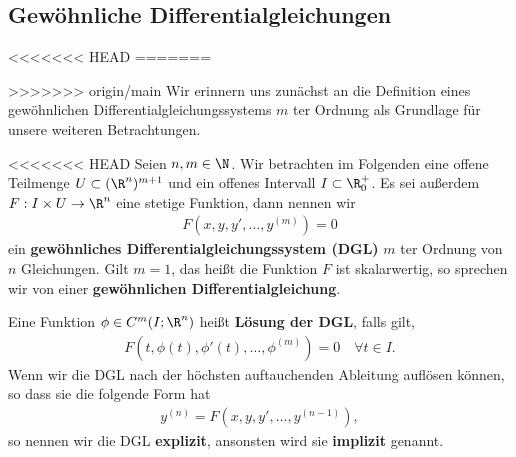 \documentclass[letterpaper,10pt,english]{jupyterBook}
\begin{document}
\subsection{Gewöhnliche Differentialgleichungen}
\label{\detokenize{ode/repetition:gewohnliche-differentialgleichungen}}
<<<<<<< HEAD
=======
\par
>>>>>>> origin/main
Wir erinnern uns zunächst an die Definition eines gewöhnlichen Differentialgleichungssystems \(m\) ter Ordnung als Grundlage für unsere weiteren Betrachtungen.
\label{ode/repetition:def:DGL}
\begin{definition}{}{}



<<<<<<< HEAD
Seien \(n,m \in \N\).
Wir betrachten im Folgenden eine offene Teilmenge \(U\subset (\R^n)^{m+1}\) und ein offenes Intervall \(I\subset\R^+_0\).
Es sei außerdem \(F:I\times U\rightarrow\R^n\) eine stetige Funktion, dann nennen wir
\begin{align}\label{equation:ode/repetition:eq:DGL}
F(x,y,y',\ldots,y^{(m)}) = 0
\end{align}
ein \textbf{gewöhnliches Differentialgleichungssystem (DGL)} \(m\) ter Ordnung von \(n\) Gleichungen.
Gilt \(m=1\), das heißt die Funktion \(F\) ist skalarwertig, so sprechen wir von einer \textbf{gewöhnlichen Differentialgleichung}.

Eine Funktion \(\phi\in C^m(I;\R^n)\) heißt \textbf{Lösung der DGL}, falls gilt,
\begin{align*}
F(t, \phi(t), \phi'(t), \ldots, \phi^{(m)}) = 0 \quad \forall t\in I.
\end{align*}
Wenn wir die DGL nach der höchsten auftauchenden Ableitung auflösen können, so dass sie die folgende Form hat
\begin{align*}
y^{(n)} = F(x,y,y',\ldots,y^{(n-1)}),
\end{align*}
so nennen wir die DGL \textbf{explizit}, ansonsten wird sie \textbf{implizit} genannt.
\end{definition}
\end{document}
